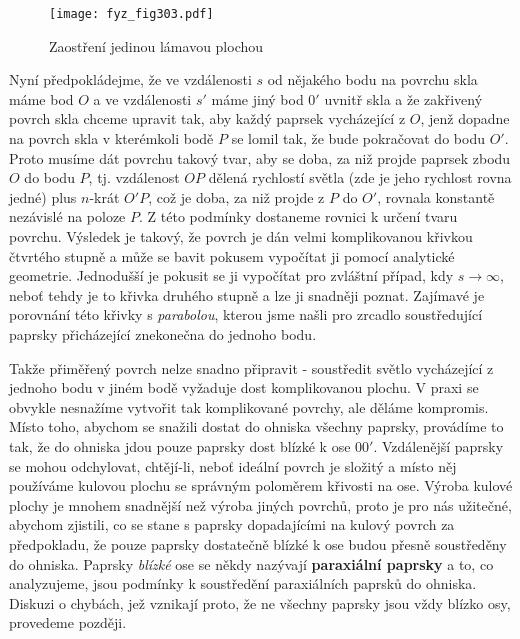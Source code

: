     \begin{figure}[ht!] %
      \centering
      \texttt{[image: fyz\_fig303.pdf]}
      \caption{Zaostření jedinou lámavou plochou
               \cite[s.~358]{Feynman01}}
      \label{fyz:fig303}  
    \end{figure}
    
    Nyní předpokládejme, že ve vzdálenosti \(s\) od nějakého bodu na povrchu skla máme bod \(O\) a 
    ve vzdálenosti \(s'\) máme jiný bod \(0'\) uvnitř skla a že zakřivený povrch skla chceme 
    upravit tak, aby každý paprsek vycházející z \(O\), jenž dopadne na povrch skla v kterémkoli 
    bodě \(P\) se lomil tak, že bude pokračovat do bodu \(O'\). Proto musíme dát povrchu takový 
    tvar, aby se doba, za niž projde paprsek zbodu \(O\) do bodu \(P\), tj. vzdálenost \(OP\) 
    dělená rychlostí světla (zde je jeho rychlost rovna jedné) plus \(n\)-krát \(O'P\), což je 
    doba, za niž projde z \(P\) do \(O'\), rovnala konstantě nezávislé na poloze \(P\). Z této 
    podmínky dostaneme rovnici k určení tvaru povrchu. Výsledek je takový, že povrch je dán velmi 
    komplikovanou křivkou čtvrtého stupně a může se bavit pokusem vypočítat ji pomocí analytické 
    geometrie. Jednodušší je pokusit se ji vypočítat pro zvláštní případ, kdy 
    \(s\rightarrow\infty\), neboť tehdy je to křivka druhého stupně a lze ji snadněji poznat. 
    Zajímavé je porovnání této křivky s \emph{parabolou}, kterou jsme našli pro zrcadlo 
    soustředující paprsky přicházející znekonečna do jednoho bodu.
    
    Takže přiměřený povrch nelze snadno připravit - soustředit světlo vycházející z jednoho bodu v 
    jiném bodě vyžaduje dost komplikovanou plochu. V praxi se obvykle nesnažíme vytvořit tak 
    komplikované povrchy, ale děláme kompromis. Místo toho, abychom se snažili dostat do ohniska 
    všechny paprsky, provádíme to tak, že do ohniska jdou pouze paprsky dost blízké k ose \(00'\). 
    Vzdálenější paprsky se mohou odchylovat, chtějí-li, neboť ideální povrch je složitý a místo něj 
    používáme kulovou plochu se správným poloměrem křivosti na ose. Výroba kulové plochy je mnohem 
    snadnější než výroba jiných povrchů, proto je pro nás užitečné, abychom zjistili, co se stane s 
    paprsky dopadajícími na kulový povrch za předpokladu, že pouze paprsky dostatečně blízké k ose 
    budou přesně soustředěny do ohniska. Paprsky \emph{blízké} ose se někdy nazývají 
    \textbf{paraxiální paprsky} a to, co analyzujeme, jsou podmínky k soustředění paraxiálních 
    paprsků do ohniska. Diskuzi o chybách, jež vznikají proto, že ne všechny paprsky jsou vždy 
    blízko osy, provedeme později.
    
